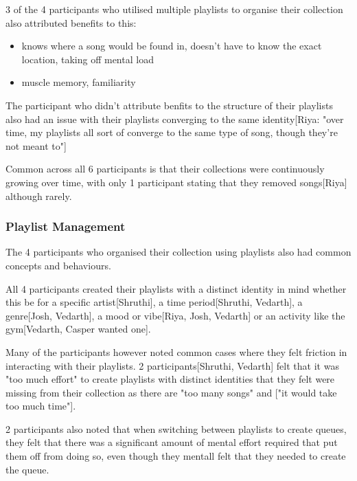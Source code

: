 3 of the 4 participants who utilised multiple playlists to organise their collection also attributed benefits to this:\begin{itemize}
    \item knows where a song would be found in, doesn't have to know the exact location, taking off mental load
    \item muscle memory, familiarity
\end{itemize}
The participant who didn't attribute benfits to the structure of their playlists also had an issue with their playlists converging to the same identity[Riya: "over time, my playlists all sort of converge to the same type of song, though they're not meant to"]

Common across all 6 participants is that their collections were continuously growing over time, with only 1 participant stating that they removed songs[Riya] although rarely. %

\subsubsection{Playlist Management}
The 4 participants who organised their collection using playlists also had common concepts and behaviours.

All 4 participants created their playlists with a distinct identity in mind whether this be for a specific artist[Shruthi], a time period[Shruthi, Vedarth], a genre[Josh, Vedarth], a mood or vibe[Riya, Josh, Vedarth] or an activity like the gym[Vedarth, Casper wanted one].

Many of the participants however noted common cases where they felt friction in interacting with their playlists. 2 participants[Shruthi, Vedarth] felt that it was "too much effort" to create playlists with distinct identities that they felt were missing from their collection as there are "too many songs" and ["it would take too much time"].

2 participants also noted that when switching between playlists to create queues, they felt that there was a significant amount of mental effort required that put them off from doing so, even though they mentall felt that they needed to create the queue.

